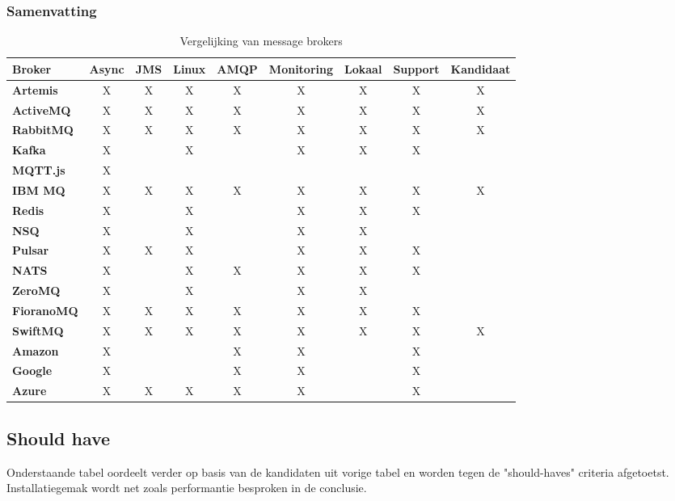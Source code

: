 \subsubsection{Samenvatting}
\begin{table}[h!]
  \centering
  \footnotesize
\begin{tabular}{|l|c|c|c|c|c|c|c|c|}
  \hline
  \textbf{Broker} & \textbf{Async} & \textbf{JMS} & \textbf{Linux} & \textbf{AMQP} & \textbf{Monitoring} & \textbf{Lokaal} & \textbf{Support} & \textbf{Kandidaat}\\ \hline
  \textbf{Artemis}   & X & X & X & X & X & X & X & X \\ \hline
  \textbf{ActiveMQ}  & X & X & X & X & X & X & X & X \\ \hline
  \textbf{RabbitMQ}  & X & X & X & X & X & X & X & X \\ \hline
  \textbf{Kafka}     & X &   & X &   & X & X & X &   \\ \hline
  \textbf{MQTT.js}   & X &   &   &   &   &   &   &   \\ \hline
  \textbf{IBM MQ}    & X & X & X & X & X & X & X & X \\ \hline
  \textbf{Redis}     & X &   & X &   & X & X & X &   \\ \hline
  \textbf{NSQ}       & X &   & X &   & X & X &   &   \\ \hline
  \textbf{Pulsar}    & X & X & X &   & X & X & X &   \\ \hline
  \textbf{NATS}      & X &   & X & X & X & X & X &   \\ \hline
  \textbf{ZeroMQ}    & X &   & X &   & X & X &   &   \\ \hline
  \textbf{FioranoMQ} & X & X & X & X & X & X & X &   \\ \hline
  \textbf{SwiftMQ}   & X & X & X & X & X & X & X & X \\ \hline
  \textbf{Amazon}    & X &   &   & X & X &   & X &   \\ \hline
  \textbf{Google}    & X &   &   & X & X &   & X &   \\ \hline
  \textbf{Azure}     & X & X & X & X & X &   & X &   \\ \hline
\end{tabular}
\caption{Vergelijking van message brokers}
\label{tab:vergelijking_message_brokers_must_have}
\end{table}


\newpage
\subsection{Should have} 
Onderstaande tabel oordeelt verder op basis van de kandidaten uit vorige tabel en worden tegen de "should-haves" criteria afgetoetst.
Installatiegemak wordt net zoals performantie besproken in de conclusie.

